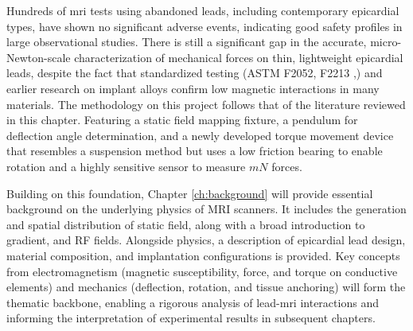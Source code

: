 Hundreds of \gls{mri} tests using abandoned leads, including contemporary epicardial types, have shown no significant adverse events, indicating good safety profiles in large observational studies. There is still a significant gap in the accurate, micro-Newton-scale characterization of mechanical forces on thin, lightweight epicardial leads, despite the fact that standardized testing (ASTM F2052, F2213 \cite{astmF2052},\cite{astm2213}) and earlier research on implant alloys confirm low magnetic interactions in many materials. The methodology on this project follows that of the literature reviewed in this chapter. Featuring a static field mapping fixture, a pendulum for deflection angle determination, and a newly developed torque movement device that resembles a suspension method but uses a low friction bearing to enable rotation and a highly sensitive sensor to measure $mN$ forces.

Building on this foundation, Chapter \ref{ch:background} will provide essential background on the underlying physics of MRI scanners. It includes the generation and spatial distribution of static field, along with a broad introduction to gradient, and RF fields. Alongside physics, a description of epicardial lead design, material composition, and implantation configurations is provided. Key concepts from electromagnetism (magnetic susceptibility, force, and torque on conductive elements) and mechanics (deflection, rotation, and tissue anchoring) will form the thematic backbone, enabling a rigorous analysis of lead-\gls{mri} interactions and informing the interpretation of experimental results in subsequent chapters.

